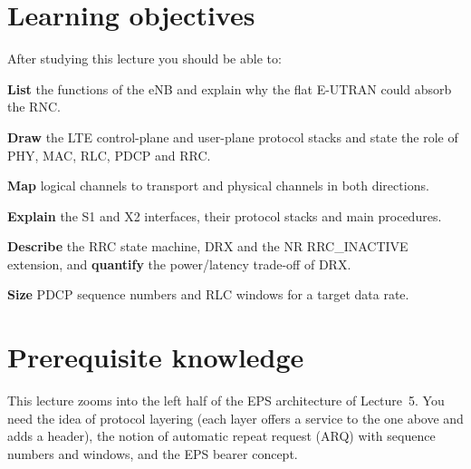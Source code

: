 \documentclass[11pt,a4paper]{article}
\begin{document}
\ACNcover

\section{Learning objectives}
After studying this lecture you should be able to:
\begin{objectives}
  \item \textbf{List} the functions of the eNB and explain why the flat E-UTRAN could absorb
        the RNC.
  \item \textbf{Draw} the LTE control-plane and user-plane protocol stacks and state the role of
        PHY, MAC, RLC, PDCP and RRC.
  \item \textbf{Map} logical channels to transport and physical channels in both directions.
  \item \textbf{Explain} the S1 and X2 interfaces, their protocol stacks and main procedures.
  \item \textbf{Describe} the RRC state machine, DRX and the NR RRC\_INACTIVE extension, and
        \textbf{quantify} the power/latency trade-off of DRX.
  \item \textbf{Size} PDCP sequence numbers and RLC windows for a target data rate.
\end{objectives}

\section{Prerequisite knowledge}
This lecture zooms into the left half of the EPS architecture of Lecture~5. You need the
idea of protocol layering (each layer offers a service to the one above and adds a header),
the notion of automatic repeat request (ARQ) with sequence numbers and windows, and the
EPS bearer concept.
\end{document}
